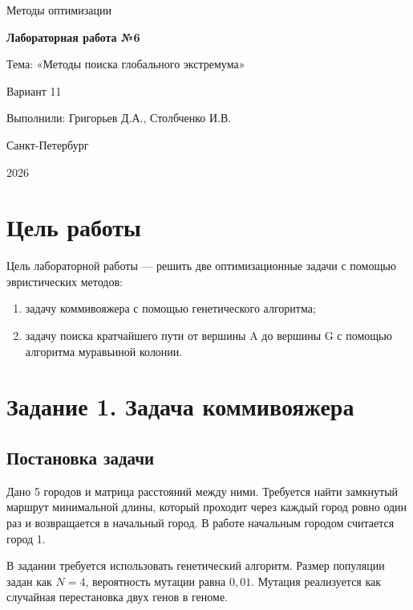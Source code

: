 \documentclass[12pt,a4paper]{article}
\begin{document}
\begin{titlepage}
    \centering
    {\large Методы оптимизации\par}
    \vspace{1.2cm}
    {\Large\bfseries Лабораторная работа №6\par}
    \vspace{0.4cm}
    {\large Тема: «Методы поиска глобального экстремума»\par}
    \vspace{0.8cm}
    {\large Вариант 11\par}
    \vfill
    \begin{flushright}
        Выполнили: Григорьев Д.А., Столбченко И.В.
    \end{flushright}
    \vfill
    {Санкт-Петербург\par}
    {2026\par}
\end{titlepage}

\tableofcontents
\newpage

\section{Цель работы}
Цель лабораторной работы --- решить две оптимизационные задачи с помощью эвристических методов:
\begin{enumerate}
    \item задачу коммивояжера с помощью генетического алгоритма;
    \item задачу поиска кратчайшего пути от вершины A до вершины G с помощью алгоритма муравьиной колонии.
\end{enumerate}

\section{Задание 1. Задача коммивояжера}
\subsection{Постановка задачи}
Дано 5 городов и матрица расстояний между ними. Требуется найти замкнутый маршрут минимальной длины, который проходит через каждый город ровно один раз и возвращается в начальный город. В работе начальным городом считается город 1.

В задании требуется использовать генетический алгоритм. Размер популяции задан как $N=4$, вероятность мутации равна $0{,}01$. Мутация реализуется как случайная перестановка двух генов в геноме.
\end{document}

